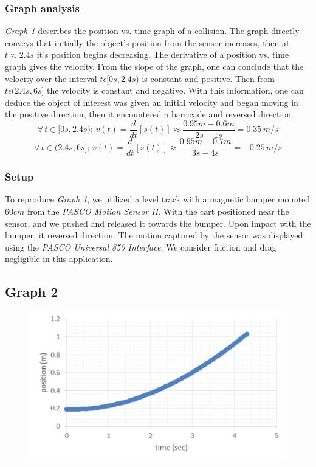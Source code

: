 \documentclass[11pt, letterpaper, includehead]{article}
\begin{document}
  \subsubsection{Graph analysis}
  \emph{Graph 1} describes the position vs. time graph of a collision.
  The graph directly conveys that initially the object's position from 
  the sensor increases, then at $t\approx2.4s$ it's position begins decreasing. 
  The derivative of a position vs. time graph gives the velocity. From the slope 
  of the graph, one can conclude that the velocity over the interval $t\epsilon[0s, 2.4s)$
  is constant and positive. Then from $t \epsilon (2.4s, 6s]$ the velocity is constant 
  and negative. With this information, one can deduce the object of interest was given 
  an initial velocity and began moving in the positive direction, then it encountered 
  a barricade and reversed direction.
  $$\forall \, t \in [0s, 2.4s); \, v(t) = \frac{d}{dt}[s(t)] \approx \frac{0.95m - 0.6m}{2s - 1s} = 0.35 \, m/s$$
  $$\forall \, t \in (2.4s, 6s]; \, v(t) = \frac{d}{dt}[s(t)] \approx \frac{0.95m - 0.7m}{3s - 4s} = -0.25 \, m/s$$

  \subsubsection{Setup}
  To reproduce \emph{Graph 1}, we utilized a level track with a magnetic bumper mounted $60cm$ 
  from the \emph{PASCO Motion Sensor II}. With the cart positioned near the sensor, and we 
  pushed and released it towards the bumper. Upon impact with the bumper, it reversed 
  direction. The motion captured by the sensor was displayed using the \emph{PASCO Universal 
  850 Interface}. We consider friction and drag negligible in this application. \\

  \subsection{Graph 2}

  \begin{figure}[H] %
    \centering 
    \includegraphics[width=\linewidth]{graph_2.png}
  \end{figure}
\end{document}
